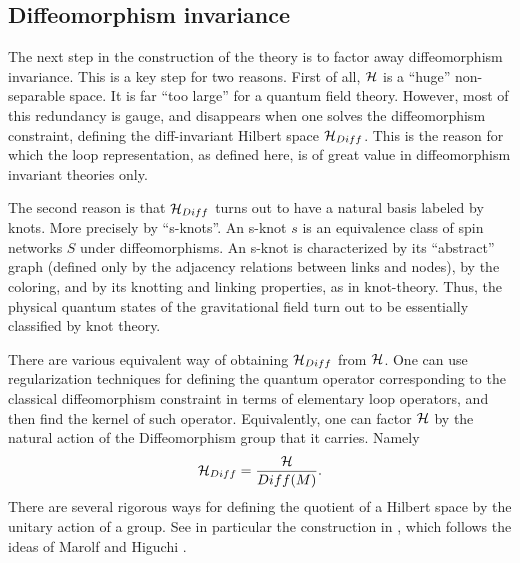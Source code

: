 \documentclass[12pt]{article}
\begin{document}
\subsection{Diffeomorphism invariance}\label{diffinvariance}

The next step in the construction of the theory is to factor 
away diffeomorphism invariance.  This is a key step for two 
reasons.  First of all, $\cal H$ is a ``huge'' non-separable 
space.  It is far ``too large'' for a quantum field theory.  
However, most of this redundancy is gauge, and disappears 
when one solves the diffeomorphism constraint, defining the 
diff-invariant Hilbert space ${\cal H}_{Diff}$.  This is the reason 
for which the loop representation, as defined here, is of 
great value in diffeomorphism invariant theories only.

The second reason is that ${\cal H}_{Diff}$ turns out to have a 
natural basis labeled by knots.  More precisely by 
``s-knots''.  An s-knot $s$ is an equivalence class of spin 
networks $S$ under diffeomorphisms.  An s-knot is 
characterized by its ``abstract'' graph (defined only by the 
adjacency relations between links and nodes), by the 
coloring, and by its knotting and linking properties, as in 
knot-theory. Thus, the physical quantum states of the 
gravitational field turn out to be essentially classified by 
knot theory.

There are various equivalent way of obtaining ${\cal H}_{Diff}$ 
from ${\cal H}$.  One can use regularization techniques for 
defining the quantum operator corresponding to the classical 
diffeomorphism constraint in terms of elementary loop 
operators, and then find the kernel of such operator.  
Equivalently, one can factor ${\cal H}$ by the natural action 
of the Diffeomorphism group that it carries.  Namely 
\begin{equation} 
{\cal H}_{Diff}={{\cal H}\over Diff(M)}.  
\end{equation} 
There are several rigorous ways for defining the quotient of a 
Hilbert space by the unitary action of a group.  See in 
particular the construction in \cite{AshtekarEtAl95}, which 
follows the ideas of Marolf and Higuchi 
\cite{MarolfGroup,MarolfGroup2,MarolfGroup3,Higuchi}.
\end{document}
